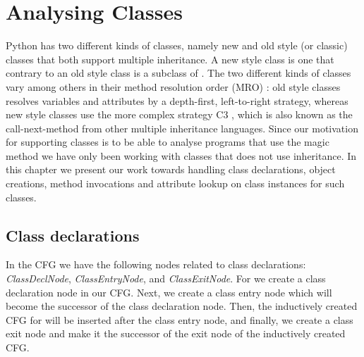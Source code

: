 \chapter{Analysing Classes}
Python has two different kinds of classes, namely new and old style (or classic) classes that both support multiple inheritance. A new style class is one that contrary to an old style class is a subclass of . The two different kinds of classes vary among others in their method resolution order (MRO) \cite{pyref.typehierarchy}: old style classes resolves variables and attributes by a depth-first, left-to-right strategy, whereas new style classes use the more complex strategy C3 \cite{pyref.c3mro}, which is also known as the call-next-method from other multiple inheritance languages. Since our motivation for supporting classes is to be able to analyse programs that use the magic method  we have only been working with classes that does not use inheritance. In this chapter we present our work towards handling class declarations, object creations, method invocations and attribute lookup on class instances for such classes.





\section{Class declarations}
In the CFG we have the following nodes related to class declarations: \textit{ClassDeclNode}, \textit{ClassEntryNode}, and \textit{ClassExitNode}. For  we create a class declaration node in our CFG. Next, we create a class entry node which will become the successor of the class declaration node. Then, the inductively created CFG for  will be inserted after the class entry node, and finally, we create a class exit node and make it the successor of the exit node of the inductively created  CFG.

